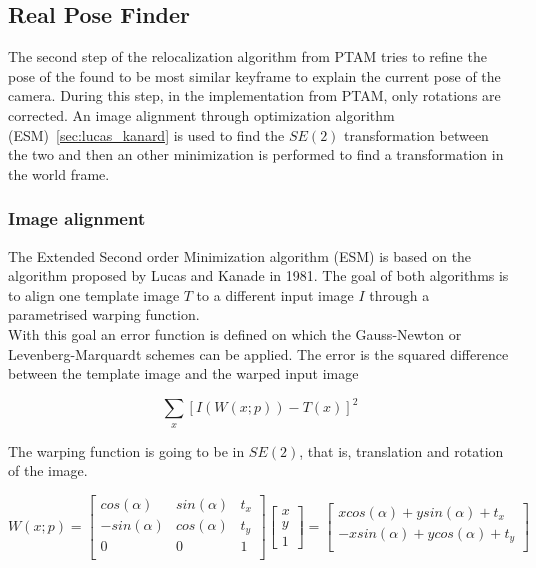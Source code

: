 \subsection{Real Pose Finder}
\label{sub:real_pose_finder}

The second step of the relocalization algorithm from PTAM tries to refine the pose of the found to be most similar keyframe to explain the current pose of the camera. During this step, in the implementation from PTAM, only rotations are corrected. An image alignment through optimization algorithm (ESM)~\ref{sec:lucas_kanard} is used to find the $SE(2)$ transformation between the two and then an other minimization is performed to find a transformation in the world frame.\\

\subsubsection{Image alignment}
\label{ssub:image_alignment}

The Extended Second order Minimization algorithm (ESM) is based on the algorithm proposed by Lucas and Kanade \cite{Baker2004} in 1981. The goal of both algorithms is to align one template image $T$ to a different input image $I$ through a parametrised warping function. \\

With this goal an error function is defined on which the Gauss-Newton or Levenberg-Marquardt schemes can be applied. The error is the squared difference between the template image and the warped input image

\begin{equation}
  \sum_x [I(W(x;p)) - T(x)]^2
\end{equation}

The warping function is going to be in $SE(2)$, that is, translation and rotation of the image.

\begin{equation}
  W(x;p) = 
  \begin{bmatrix}
    cos (\alpha) & sin(\alpha) & t_x\\
    -sin(\alpha) & cos(\alpha) & t_y\\
    0 & 0 & 1 \\
  \end{bmatrix}
  \begin{bmatrix} x \\ y \\ 1 \end{bmatrix}
    =
  \begin{bmatrix}
    xcos(\alpha) + y sin(\alpha) + t_x \\
    -x sin(\alpha) + y cos(\alpha) + t_y \\
  \end{bmatrix}
  \label{eq:se2_warp_function}
\end{equation}


